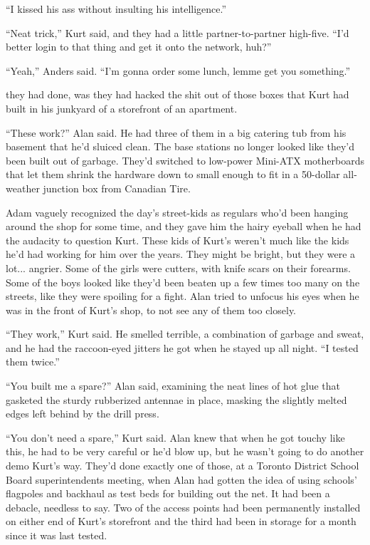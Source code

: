 ``I kissed his ass without insulting his intelligence.''

``Neat trick,'' Kurt said, and they had a little partner-to-partner
high-five.  ``I'd better login to that thing and get it onto the
network, huh?''

``Yeah,'' Anders said.  ``I'm gonna order some lunch, lemme get you
something.''

 they had done, was they had hacked the shit out of those boxes
that Kurt had built in his junkyard of a storefront of an apartment.

``These work?'' Alan said.  He had three of them in a big catering tub
from his basement that he'd sluiced clean.  The base stations no
longer looked like they'd been built out of garbage.  They'd switched
to low-power Mini-ATX motherboards that let them shrink the hardware
down to small enough to fit in a 50-dollar all-weather junction box
from Canadian Tire.

Adam vaguely recognized the day's street-kids as regulars who'd been
hanging around the shop for some time, and they gave him the hairy
eyeball when he had the audacity to question Kurt.  These kids of
Kurt's weren't much like the kids he'd had working for him over the
years.  They might be bright, but they were a lot...  angrier.  Some
of the girls were cutters, with knife scars on their forearms.  Some
of the boys looked like they'd been beaten up a few times too many on
the streets, like they were spoiling for a fight.  Alan tried to
unfocus his eyes when he was in the front of Kurt's shop, to not see
any of them too closely.

``They work,'' Kurt said.  He smelled terrible, a combination of
garbage and sweat, and he had the raccoon-eyed jitters he got when he
stayed up all night.  ``I tested them twice.''

``You built me a spare?'' Alan said, examining the neat lines of hot
glue that gasketed the sturdy rubberized antennae in place, masking
the slightly melted edges left behind by the drill press.

``You don't need a spare,'' Kurt said.  Alan knew that when he got
touchy like this, he had to be very careful or he'd blow up, but he
wasn't going to do another demo Kurt's way.  They'd done exactly one
of those, at a Toronto District School Board superintendents meeting,
when Alan had gotten the idea of using schools' flagpoles and backhaul
as test beds for building out the net.  It had been a debacle,
needless to say.  Two of the access points had been permanently
installed on either end of Kurt's storefront and the third had been in
storage for a month since it was last tested.

